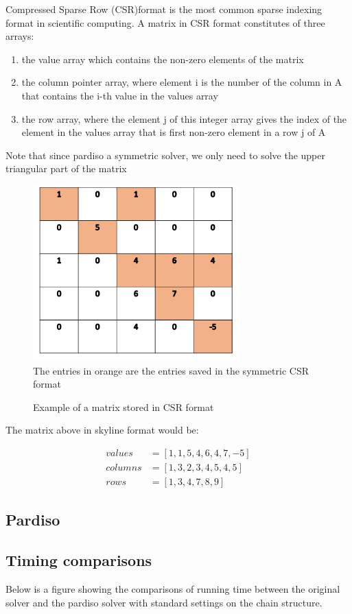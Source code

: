\documentclass[11pt]{article}
\begin{document}
Compressed Sparse Row (CSR)format is the most common sparse indexing format in scientific computing. A matrix in CSR format constitutes of three arrays:
\begin{enumerate}
\item the value array which contains the non-zero elements of the matrix
\item the column pointer array, where element i is the number of the column in A that contains the i-th value in the values array
\item the row array, where the element j of this integer array gives the index of the element in the values array that is first non-zero element in a row j of A
\end{enumerate}
Note that since pardiso a symmetric solver, we only need to solve the upper triangular part of the matrix
\begin{figure}[H]
\begin{center}
\caption{Example of a matrix stored in CSR format}
\includegraphics[width=8cm]{csr}
\label{fig:csr}\\
The entries in orange are the entries saved in the symmetric CSR format
\end{center}
\end{figure}

The matrix above in skyline format would be:

\begin{align}
values&=[1,1,5,4,6,4,7,-5]\\
columns&= [1,3,2,3,4,5,4,5] \\
rows&= [1,3,4,7,8,9] 
\end{align}

\subsection{Pardiso}
\subsection{Timing comparisons}
Below is a figure showing  the comparisons of running time between the original solver and the pardiso solver with standard settings on the chain structure. \\
\end{document}
